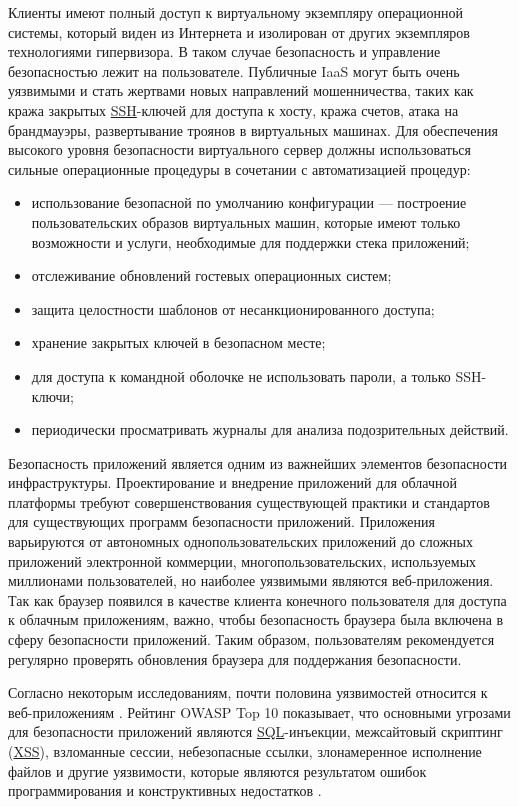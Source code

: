 Клиенты имеют полный доступ к виртуальному экземпляру операционной системы, который виден из Интернета и изолирован от других экземпляров технологиями гипервизора.
В таком случае безопасность и управление безопасностью лежит на пользователе.
Публичные IaaS могут быть очень уязвимыми и стать жертвами новых направлений мошенничества, таких как кража закрытых \hyperlink{ssh}{SSH}-ключей для доступа к хосту, кража счетов, атака на брандмауэры, развертывание троянов в виртуальных машинах.
Для обеспечения высокого уровня безопасности виртуального сервер должны использоваться сильные операционные процедуры в сочетании с автоматизацией процедур:
\begin{itemize}
  \item использование безопасной по умолчанию конфигурации --- построение пользовательских образов виртуальных машин, которые имеют только возможности и услуги, необходимые для поддержки стека приложений;
  \item отслеживание обновлений гостевых операционных систем;
  \item защита целостности шаблонов от несанкционированного доступа;
  \item хранение закрытых ключей в безопасном месте;
  \item для доступа к командной оболочке не использовать пароли, а только SSH-ключи;
  \item периодически просматривать журналы для анализа подозрительных действий.
\end{itemize}

Безопасность приложений является одним из важнейших элементов безопасности инфраструктуры.
Проектирование и внедрение приложений для облачной платформы требуют совершенствования существующей практики и стандартов для существующих программ безопасности приложений.
Приложения варьируются от автономных однопользовательских приложений до сложных приложений электронной коммерции, многопользовательских, используемых миллионами пользователей, но наиболее уязвимыми являются веб-приложения.
Так как браузер появился в качестве клиента конечного пользователя для доступа к облачным приложениям, важно, чтобы безопасность браузера была включена в сферу безопасности приложений.
Таким образом, пользователям рекомендуется регулярно проверять обновления браузера для поддержания безопасности.

Согласно некоторым исследованиям, почти половина уязвимостей относится к веб-приложениям \cite{cis}.
Рейтинг OWASP Top 10 показывает, что основными угрозами для безопасности приложений являются \hyperlink{sql}{SQL}-инъекции, межсайтовый скриптинг (\hyperlink{xs}{XSS}), взломанные сессии, небезопасные ссылки, злонамеренное исполнение файлов и другие уязвимости, которые являются результатом ошибок программирования и конструктивных недостатков \cite{owasp}.


